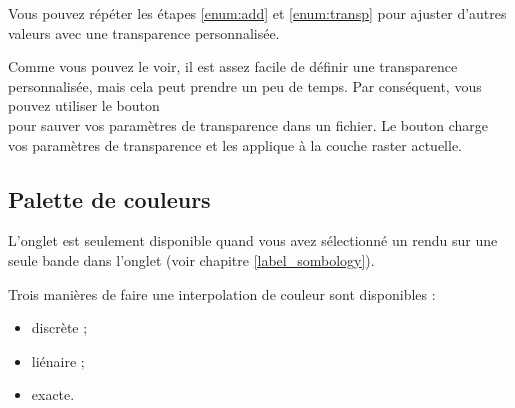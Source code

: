 Vous pouvez répéter les étapes \ref{enum:add} et \ref{enum:transp} pour ajuster d'autres valeurs avec une transparence personnalisée. 

Comme vous pouvez le voir, il est assez facile de définir une transparence
personnalisée, mais cela peut prendre un peu de temps. Par conséquent, vous pouvez utiliser le bouton\\  pour sauver vos paramètres  de transparence dans un fichier. Le bouton  charge vos paramètres de transparence et les applique à la couche raster actuelle.

 \subsection{Palette de couleurs} \label{label_colormaptab}

L'onglet  est seulement disponible quand vous avez sélectionné un rendu sur une seule bande dans l'onglet  (voir chapitre \ref{label_sombology}).

Trois manières de faire une interpolation de couleur sont disponibles :
\begin{itemize}[label=--]
\item discrète ;
\item liénaire ;
\item exacte.
\end{itemize}

